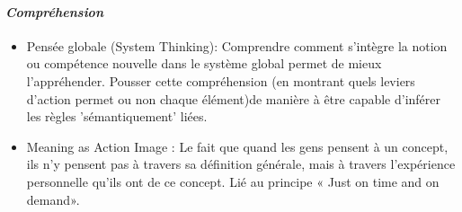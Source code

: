 			\paragraph{\emph{Compréhension}}
		\begin{itemize}
				\item {Pensée globale (System Thinking)}: Comprendre comment s'intègre la notion ou compétence nouvelle dans le système global permet de mieux l'appréhender. Pousser cette compréhension (en montrant quels leviers d'action permet ou non chaque élément)de manière à être capable d'inférer les règles 'sémantiquement' liées.
				\item {Meaning as Action Image} : Le fait que quand les gens pensent à un concept, ils n'y pensent pas à travers sa définition générale, mais à travers l'expérience personnelle qu'ils ont de ce concept. Lié au principe « Just on time and on demand».
		\end{itemize}	


